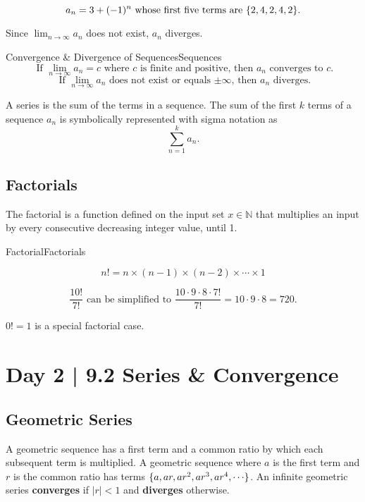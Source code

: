 \documentclass[10pt]{article}
\theoremstyle{definition}
\DeclarePairedDelimiter{\curly}{\{}{\}}
\begin{document}
\[a_n  = 3+(-1)^n \text{ whose first five terms are } \curly*{2, 4, 2, 4, 2}.\]

\begin{center}
    Since $\displaystyle\lim_{n \to \infty} a_n$ does not exist, $a_n$ diverges.
\end{center}

\vspace{0.5cm}

\begin{definition}{Convergence \& Divergence of Sequences}{Sequences}
\vspace{-0.5cm}
    \[ \text{ If } \lim_{n \to \infty} a_n = c \text{ where } c \text{ is finite and positive, then } a_n \text{ converges to } c. \]
    \vspace{-0.5cm}
    \[ \text{ If } \lim_{n \to \infty} a_n \text{ does not exist or equals $\pm \infty$, then } a_n \text{ diverges.}\]
\end{definition}

A series is the sum of the terms in a sequence. The sum of the first $k$ terms of a sequence $a_n$ is symbolically represented with sigma notation as \[\sum_{n=1}^{k} a_n.\]

\subsection{Factorials}

The factorial is a function defined on the input set $x \in \mathbb{N}$ that multiplies an input by every consecutive decreasing integer value, until 1.

\begin{definition}{Factorial}{Factorials}

\[n!=n\times(n-1)\times(n-2)\times \cdots \times 1\]
\end{definition}

\[\frac{10!}{7!} \text{ can be simplified to } \frac{10 \cdot 9 \cdot 8 \cdot 7!}{7!}=10\cdot9\cdot8=720.\]

\begin{center}
    $0!=1$ is a special factorial case.
\end{center}



\section{Day 2 | 9.2 Series \& Convergence}

\subsection{Geometric Series}
A geometric sequence has a first term and a common ratio by which each subsequent term is multiplied. A geometric sequence where $a$ is the first term and $r$ is the common ratio has terms $\curly{a, ar, ar^2, ar^3, ar^4, \cdots}$.
An infinite geometric series \textbf{converges} if $\lvert r \rvert <1$ and \textbf{diverges} otherwise.
\end{document}
